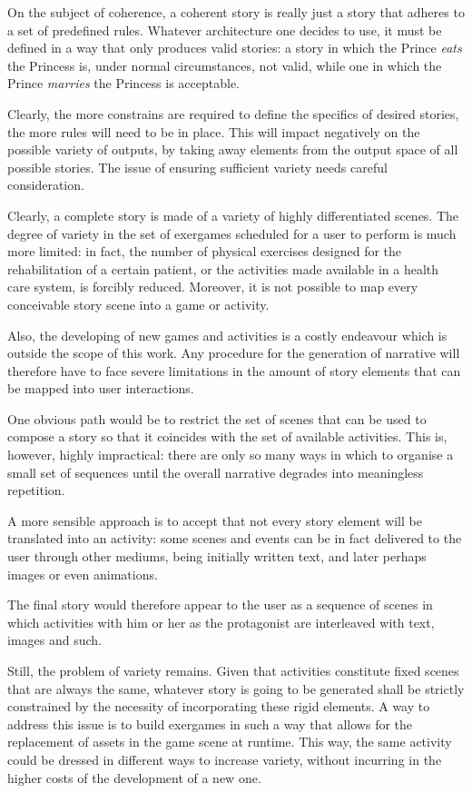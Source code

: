 \documentclass[12pt,a4paper,oneside]{report}
\begin{document}
On the subject of coherence, a coherent story is really just a story that adheres to a set of predefined rules. Whatever architecture one decides to use, it must be defined in a way that only produces valid stories: a story in which the Prince \textit{eats} the Princess is, under normal circumstances, not valid, while one in which the Prince \textit{marries} the Princess is acceptable.

Clearly, the more constrains are required to define the specifics of desired stories, the more rules will need to be in place. This will impact negatively on the possible variety of outputs, by taking away elements from the output space of all possible stories. The issue of ensuring sufficient variety needs careful consideration.

Clearly, a complete story is made of a variety of highly differentiated scenes. The degree of variety in the set of exergames scheduled for a user to perform is much more limited: in fact, the number of physical exercises designed for the rehabilitation of a certain patient, or the activities made available in a health care system, is forcibly reduced. Moreover, it is not possible to map every conceivable story scene into a game or activity.

Also, the developing of new games and activities is a costly endeavour which is outside the scope of this work. Any procedure for the generation of narrative will therefore have to face severe limitations in the amount of story elements that can be mapped into user interactions.

One obvious path would be to restrict the set of scenes that can be used to compose a story so that it coincides with the set of available activities. This is, however, highly impractical: there are only so many ways in which to organise a small set of sequences until the overall narrative degrades into meaningless repetition.

\bigskip

A more sensible approach is to accept that not every story element will be translated into an activity: some scenes and events can be in fact delivered to the user through other mediums, being initially written text, and later perhaps images or even animations.

The final story would therefore appear to the user as a sequence of scenes in which activities with him or her as the protagonist are interleaved with text, images and such.

\bigskip

Still, the problem of variety remains. Given that activities constitute fixed scenes that are always the same, whatever story is going to be generated shall be strictly constrained by the necessity of incorporating these rigid elements. A way to address this issue is to build exergames in such a way that allows for the replacement of assets in the game scene at runtime. This way, the same activity could be dressed in different ways to increase variety, without incurring in the higher costs of the development of a new one.
\end{document}

